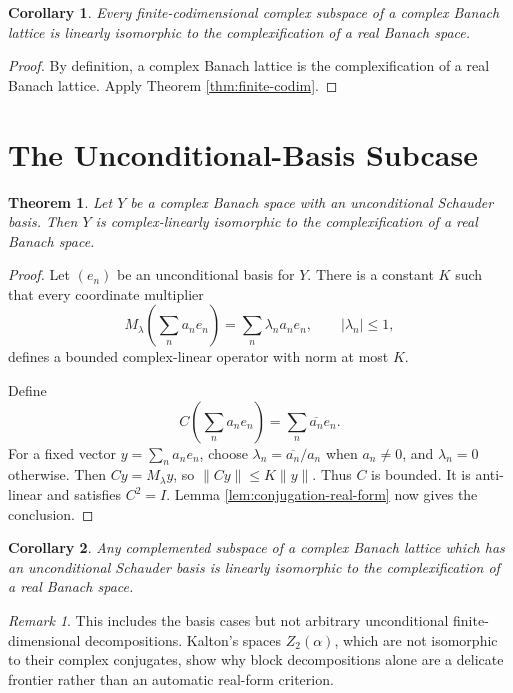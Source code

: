 \documentclass[11pt]{article}
\newtheorem{theorem}{Theorem}
\newtheorem{corollary}{Corollary}
\theoremstyle{remark}
\newtheorem{remark}{Remark}
\begin{document}
\begin{corollary}
Every finite-codimensional complex subspace of a complex Banach lattice is
linearly isomorphic to the complexification of a real Banach space.
\end{corollary}

\begin{proof}
By definition, a complex Banach lattice is the complexification of a real
Banach lattice.  Apply Theorem \ref{thm:finite-codim}.
\end{proof}

\section{The Unconditional-Basis Subcase}

\begin{theorem}\label{thm:unconditional-basis}
Let \(Y\) be a complex Banach space with an unconditional Schauder basis.
Then \(Y\) is complex-linearly isomorphic to the complexification of a real
Banach space.
\end{theorem}

\begin{proof}
Let \((e_n)\) be an unconditional basis for \(Y\).  There is a constant \(K\)
such that every coordinate multiplier
\[
  M_\lambda\left(\sum_n a_ne_n\right)=\sum_n \lambda_n a_n e_n,
  \qquad |\lambda_n|\leq 1,
\]
defines a bounded complex-linear operator with norm at most \(K\).

Define
\[
  C\left(\sum_n a_ne_n\right)=\sum_n \overline{a_n}e_n .
\]
For a fixed vector \(y=\sum_n a_ne_n\), choose
\(\lambda_n=\overline{a_n}/a_n\) when \(a_n\neq 0\), and \(\lambda_n=0\)
otherwise.  Then \(Cy=M_\lambda y\), so \(\|Cy\|\leq K\|y\|\).  Thus \(C\)
is bounded.  It is anti-linear and satisfies \(C^2=I\).  Lemma
\ref{lem:conjugation-real-form} now gives the conclusion.
\end{proof}

\begin{corollary}
Any complemented subspace of a complex Banach lattice which has an
unconditional Schauder basis is linearly isomorphic to the complexification of
a real Banach space.
\end{corollary}

\begin{remark}
This includes the basis cases but not arbitrary unconditional finite-dimensional
decompositions.  Kalton's spaces \(Z_2(\alpha)\), which are not isomorphic to
their complex conjugates, show why block decompositions alone are a delicate
frontier rather than an automatic real-form criterion.
\end{remark}
\end{document}
